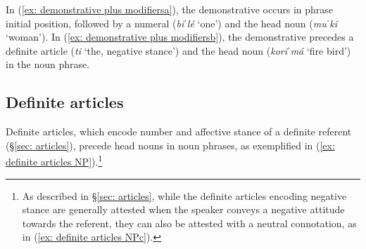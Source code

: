     \label{ex: demonstrative plus modifiersa}
        \label{ex: demonstrative plus modifiersb}

    \z
\z

In (\ref{ex: demonstrative plus modifiersa}), the demonstrative occurs in phrase initial position, followed by a numeral (\textit{biˈlé} `one') and the head noun (\textit{muˈkî} `woman'). In (\ref{ex: demonstrative plus modifiersb}), the demonstrative precedes a definite article (\textit{ti} `the, negative stance') and the head noun (\textit{koriˈmá} `fire bird') in the noun phrase.

\subsection{Definite articles}
\label{subsec: definite articles in noun phrases}

Definite articles, which encode number and affective stance of a definite referent (§\ref{sec: articles}), precede head nouns in noun phrases, as exemplified in (\ref{ex: definite articles NP}).\footnote{As described in §\ref{sec: articles}, while the definite articles encoding negative stance are generally attested when the speaker conveys a negative attitude towards the referent, they can also be attested with a neutral connotation, as in (\ref{ex: definite articles NPc}).}

